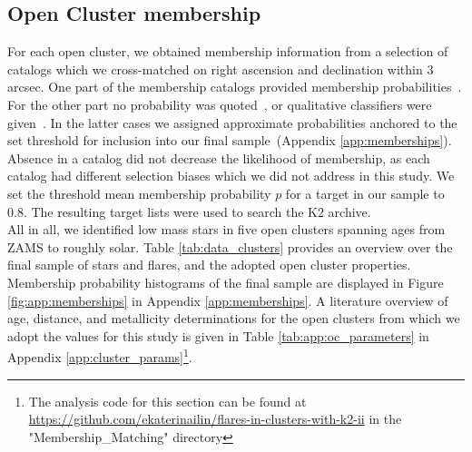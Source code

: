 \documentclass{aa}
\begin{document}
\subsection{Open Cluster membership}
\label{sec:sec:ocmem}
For each open cluster, we obtained membership information from a selection of catalogs which we cross-matched on right ascension and declination within 3 arcsec. One part of the membership catalogs provided membership probabilities~\citep{douglas_praesepe_hyades_2014, cantat_gaudin_2018, olivares_pleiades_2018, reino_hyades_2018, gao_m67mem_2018, olivares_ngc6774_2019}. For the other part no probability was quoted~\citep{rebull_pleiadesrot_2016, douglas_poking_2017, gaia_dr2_2018_hrd}, or qualitative classifiers were given~\citep{curtis2013, gonzalez_m67mem_2016,rebull_praesepe_2017}. In the latter cases we assigned approximate probabilities anchored to the set threshold for inclusion into our final sample~(Appendix \ref{app:memberships}). Absence in a catalog did not decrease the likelihood of membership, as each catalog had different selection biases which we did not address in this study. We set the threshold mean membership probability $p$ for a target in our sample to 0.8. The resulting target lists were used to search the K2 archive.
\\
All in all, we identified low mass stars in five open clusters spanning ages from ZAMS to roughly solar. Table \ref{tab:data_clusters} provides an overview over the final sample of stars and flares, and the adopted open cluster properties. Membership probability histograms of the final sample are displayed in Figure \ref{fig:app:memberships} in Appendix \ref{app:memberships}. A literature overview of age, distance, and metallicity determinations for the open clusters from which we adopt the values for this study is given in Table \ref{tab:app:oc_parameters} in Appendix \ref{app:cluster_params}\footnote{The analysis code for this section can be found at \url{https://github.com/ekaterinailin/flares-in-clusters-with-k2-ii} in the "Membership\_Matching" directory}. 
\end{document}
